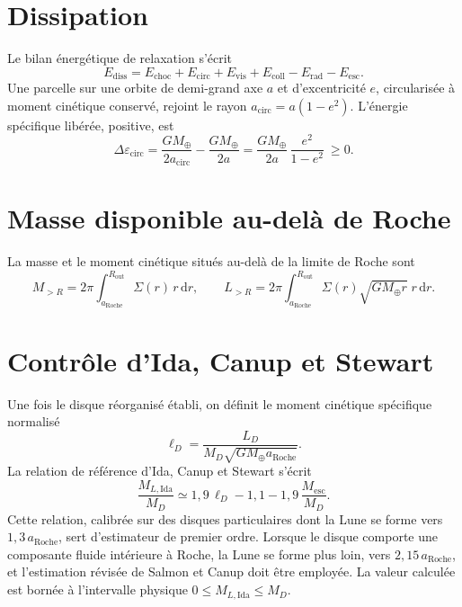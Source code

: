 \documentclass[11pt,a4paper,openany]{report}
\newcommand{\Mt}{M_{\oplus}}
\newcommand{\aR}{a_{\mathrm{Roche}}}
\newcommand{\dd}{\mathrm{d}}
\begin{document}
\section{Dissipation}

Le bilan énergétique de relaxation s'écrit
\begin{equation}
E_{\mathrm{diss}}=E_{\mathrm{choc}}+E_{\mathrm{circ}}+E_{\mathrm{vis}}+E_{\mathrm{coll}}
-E_{\mathrm{rad}}-E_{\mathrm{esc}}.
\label{eq:Ediss}
\end{equation}
Une parcelle sur une orbite de demi-grand axe $a$ et d'excentricité $e$, circularisée à moment
cinétique conservé, rejoint le rayon $a_{\mathrm{circ}}=a(1-e^2)$. L'énergie spécifique libérée,
positive, est
\begin{equation}
\Delta\varepsilon_{\mathrm{circ}}=\frac{G\Mt}{2a_{\mathrm{circ}}}-\frac{G\Mt}{2a}
=\frac{G\Mt}{2a}\,\frac{e^2}{1-e^2}\ \ge0.
\label{eq:circ}
\end{equation}

\section{Masse disponible au-delà de Roche}

La masse et le moment cinétique situés au-delà de la limite de Roche sont
\begin{equation}
M_{>R}=2\pi\int_{\aR}^{R_{\mathrm{out}}}\Sigma(r)\,r\,\dd r,
\qquad
L_{>R}=2\pi\int_{\aR}^{R_{\mathrm{out}}}\Sigma(r)\sqrt{G\Mt r}\;r\,\dd r.
\label{eq:MR}
\end{equation}

\section{Contrôle d'Ida, Canup et Stewart}

Une fois le disque réorganisé établi, on définit le moment cinétique spécifique normalisé
\begin{equation}
\ell_D=\frac{L_D}{M_D\sqrt{G\Mt\aR}}.
\label{eq:lD}
\end{equation}
La relation de référence d'Ida, Canup et Stewart \cite{Ida1997,Canup2004} s'écrit
\begin{equation}
\frac{M_{L,\mathrm{Ida}}}{M_D}\simeq1{,}9\,\ell_D-1{,}1-1{,}9\,\frac{M_{\mathrm{esc}}}{M_D}.
\label{eq:Ida}
\end{equation}
Cette relation, calibrée sur des disques particulaires dont la Lune se forme vers $1{,}3\,\aR$,
sert d'estimateur de premier ordre. Lorsque le disque comporte une composante fluide
intérieure à Roche, la Lune se forme plus loin, vers $2{,}15\,\aR$, et l'estimation révisée de
Salmon et Canup \cite{SalmonCanup2012} doit être employée. La valeur calculée est bornée à
l'intervalle physique $0\le M_{L,\mathrm{Ida}}\le M_D$.
\end{document}
